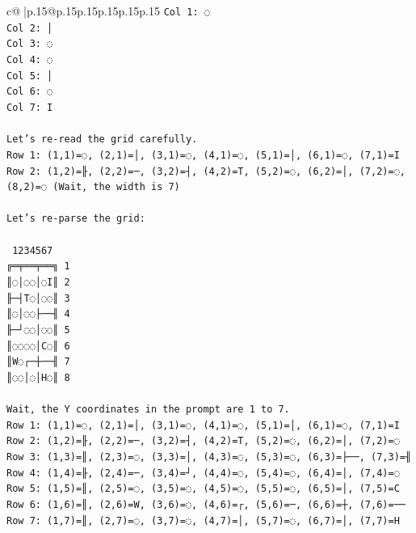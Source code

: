 \documentclass{article}
\begin{document}
{\begin{supertabular}{c@{$\;$}|p{.15\linewidth}@{}p{.15\linewidth}p{.15\linewidth}p{.15\linewidth}p{.15\linewidth}p{.15\linewidth}}
{{{\texttt{Col 1: ◌} \\
\texttt{Col 2: │} \\
\texttt{Col 3: ◌} \\
\texttt{Col 4: ◌} \\
\texttt{Col 5: │} \\
\texttt{Col 6: ◌} \\
\texttt{Col 7: I} \\
\\ 
\texttt{Let's re{-}read the grid carefully.} \\
\texttt{Row 1: (1,1)=◌, (2,1)=│, (3,1)=◌, (4,1)=◌, (5,1)=│, (6,1)=◌, (7,1)=I} \\
\texttt{Row 2: (1,2)=╟, (2,2)=─, (3,2)=┤, (4,2)=T, (5,2)=◌, (6,2)=│, (7,2)=◌, (8,2)=◌ (Wait, the width is 7)} \\
\\ 
\texttt{Let's re{-}parse the grid:} \\
\\ 
\texttt{ 1234567} \\
\texttt{╔═╤══╤══╗ 1} \\
\texttt{║◌│◌◌│◌I║ 2} \\
\texttt{╟─┤T◌│◌◌║ 3} \\
\texttt{║◌│◌◌├──╢ 4} \\
\texttt{╟─┘◌◌│◌◌║ 5} \\
\texttt{║◌◌◌◌│C◌║ 6} \\
\texttt{║W◌┌─┼──╢ 7} \\
\texttt{║◌◌│◌│H◌║ 8} \\
\\ 
\texttt{Wait, the Y coordinates in the prompt are 1 to 7.} \\
\texttt{Row 1: (1,1)=◌, (2,1)=│, (3,1)=◌, (4,1)=◌, (5,1)=│, (6,1)=◌, (7,1)=I} \\
\texttt{Row 2: (1,2)=╟, (2,2)=─, (3,2)=┤, (4,2)=T, (5,2)=◌, (6,2)=│, (7,2)=◌} \\
\texttt{Row 3: (1,3)=║, (2,3)=◌, (3,3)=│, (4,3)=◌, (5,3)=◌, (6,3)=├──, (7,3)=╢} \\
\texttt{Row 4: (1,4)=╟, (2,4)=─, (3,4)=┘, (4,4)=◌, (5,4)=◌, (6,4)=│, (7,4)=◌} \\
\texttt{Row 5: (1,5)=║, (2,5)=◌, (3,5)=◌, (4,5)=◌, (5,5)=◌, (6,5)=│, (7,5)=C} \\
\texttt{Row 6: (1,6)=║, (2,6)=W, (3,6)=◌, (4,6)=┌, (5,6)=─, (6,6)=┼, (7,6)=──} \\
\texttt{Row 7: (1,7)=║, (2,7)=◌, (3,7)=◌, (4,7)=│, (5,7)=◌, (6,7)=│, (7,7)=H} \\
\\ 
}}}
\end{supertabular}}
\end{document}
